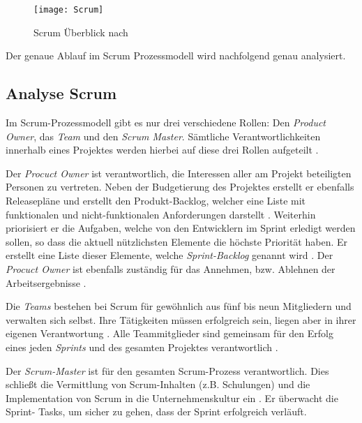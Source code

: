 \begin{figure}[htp]
\begin{center}
  \texttt{[image: Scrum]} %
  \caption{Scrum Überblick nach \cite{scrum2008}}
  \label{fig:Scrum}
\end{center}
\end{figure}

Der genaue Ablauf im Scrum Prozessmodell wird nachfolgend genau analysiert.

\subsection{Analyse Scrum}


Im Scrum-Prozessmodell gibt es nur drei verschiedene Rollen: Den \textit{Product Owner}, das \textit{Team} und den \textit{Scrum Master}. Sämtliche Verantwortlichkeiten innerhalb eines Projektes werden hierbei auf diese drei Rollen aufgeteilt \cite{Schwaber2004}. \newline

Der \textit{Procuct Owner} ist verantwortlich, die Interessen aller am Projekt beteiligten Personen zu vertreten. Neben der Budgetierung des Projektes erstellt er ebenfalls Releasepläne und erstellt den Produkt-Backlog, welcher eine Liste mit funktionalen und nicht-funktionalen Anforderungen darstellt \cite{Schwaber2004, Pichler2010,Schwaber2007}. Weiterhin priorisiert er die Aufgaben, welche von den Entwicklern im Sprint erledigt werden sollen, so dass die aktuell nützlichsten Elemente die höchste Priorität haben. Er erstellt eine Liste dieser Elemente, welche \textit{Sprint-Backlog} genannt wird \cite{Henning2011, Schwaber2007,Pichler2010}. Der \textit{Procuct Owner} ist ebenfalls zuständig für das Annehmen, bzw. Ablehnen der Arbeitsergebnisse \cite{eclipseScrum}. \newline

Die \textit{Teams} bestehen bei Scrum für gewöhnlich aus fünf bis neun Mitgliedern und verwalten sich selbst. Ihre Tätigkeiten müssen erfolgreich sein, liegen aber in ihrer eigenen Verantwortung \cite{Pries2011, Wolf2011}. Alle Teammitglieder sind gemeinsam für den Erfolg eines jeden \textit{Sprints} und des gesamten Projektes verantwortlich \cite{Pichler2010}. \newline

Der \textit{Scrum-Master} ist für den gesamten Scrum-Prozess verantwortlich. Dies schließt die Vermittlung von Scrum-Inhalten (z.B. Schulungen) und die Implementation von Scrum in die Unternehmenskultur ein \cite{Pichler2010}. Er überwacht die Sprint- Tasks, um sicher zu gehen, dass der Sprint erfolgreich verläuft.\newline

